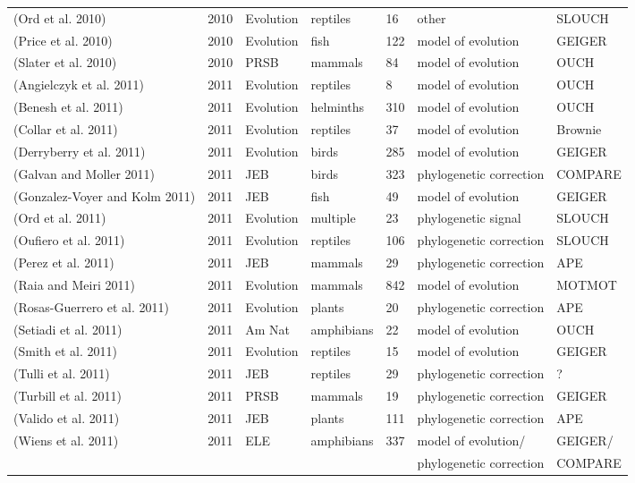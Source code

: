 \begin{longtable}{p{6cm}llllll}
(Ord et al. 2010)	&	2010	&	Evolution	&	reptiles	&	16	&	other	&	SLOUCH	\\
(Price et al. 2010)	&	2010	&	Evolution	&	fish	&	122	&	model of evolution	&	GEIGER	\\
(Slater et al. 2010)	&	2010	&	PRSB	&	mammals	&	84	&	model of evolution	&	OUCH	\\
(Angielczyk et al. 2011)	&	2011	&	Evolution	&	reptiles	&	8	&	model of evolution	&	OUCH	\\
(Benesh et al. 2011)	&	2011	&	Evolution	&	helminths	&	310	&	model of evolution	&	OUCH	\\
(Collar et al. 2011)	&	2011	&	Evolution	&	reptiles	&	37	&	model of evolution	&	Brownie	\\
(Derryberry et al. 2011)	&	2011	&	Evolution	&	birds	&	285	&	model of evolution	&	GEIGER	\\
(Galvan and Moller 2011)	&	2011	&	JEB	&	birds	&	323	&	phylogenetic correction	&	COMPARE	\\
(Gonzalez-Voyer and Kolm 2011)	&	2011	&	JEB	&	fish	&	49	&	model of evolution	&	GEIGER	\\
(Ord et al. 2011)	&	2011	&	Evolution	&	multiple	&	23	&	phylogenetic signal	&	SLOUCH	\\
(Oufiero et al. 2011) 	&	2011	&	Evolution	&	reptiles	&	106	&	phylogenetic correction	&	SLOUCH	\\
(Perez et al. 2011)	&	2011	&	JEB	&	mammals	&	29	&	phylogenetic correction	&	APE	\\
(Raia and Meiri 2011)	&	2011	&	Evolution	&	mammals	&	842	&	model of evolution	&	MOTMOT	\\
(Rosas-Guerrero et al. 2011)	&	2011	&	Evolution	&	plants	&	20	&	phylogenetic correction	&	APE	\\
(Setiadi et al. 2011)	&	2011	&	Am Nat	&	amphibians	&	22	&	model of evolution	&	OUCH	\\
(Smith et al. 2011)	&	2011	&	Evolution	&	reptiles	&	15	&	model of evolution	&	GEIGER	\\
(Tulli et al. 2011)	&	2011	&	JEB	&	reptiles	&	29	&	phylogenetic correction	&	?	\\
(Turbill et al. 2011)	&	2011	&	PRSB	&	mammals	&	19	&	phylogenetic correction	&	GEIGER	\\
(Valido et al. 2011)	&	2011	&	JEB	&	plants	&	111	&	phylogenetic correction	&	APE	\\
(Wiens et al. 2011)	&	2011	&	ELE	&	amphibians	&	337	&	model of evolution/	&	GEIGER/	\\
	&		&		&		&		&	phylogenetic correction	&	COMPARE	\\

\end{longtable}
